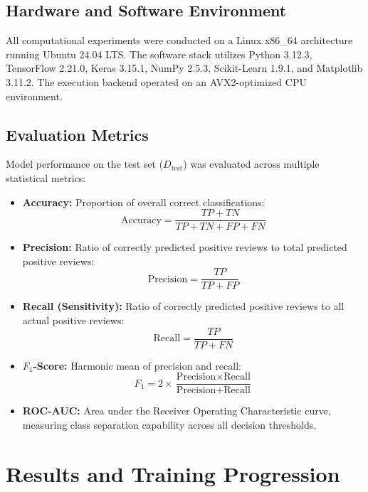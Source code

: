 \documentclass[11pt,a4paper]{article}
\begin{document}
\subsection{Hardware and Software Environment}
All computational experiments were conducted on a Linux x86\_64 architecture running Ubuntu 24.04 LTS. The software stack utilizes Python 3.12.3, TensorFlow 2.21.0, Keras 3.15.1, NumPy 2.5.3, Scikit-Learn 1.9.1, and Matplotlib 3.11.2. The execution backend operated on an AVX2-optimized CPU environment.

\subsection{Evaluation Metrics}
Model performance on the test set ($D_{\text{test}}$) was evaluated across multiple statistical metrics:
\begin{itemize}
    \item \textbf{Accuracy:} Proportion of overall correct classifications:
    \begin{equation}
    \text{Accuracy} = \frac{TP + TN}{TP + TN + FP + FN}
    \end{equation}
    \item \textbf{Precision:} Ratio of correctly predicted positive reviews to total predicted positive reviews:
    \begin{equation}
    \text{Precision} = \frac{TP}{TP + FP}
    \end{equation}
    \item \textbf{Recall (Sensitivity):} Ratio of correctly predicted positive reviews to all actual positive reviews:
    \begin{equation}
    \text{Recall} = \frac{TP}{TP + FN}
    \end{equation}
    \item \textbf{$F_1$-Score:} Harmonic mean of precision and recall:
    \begin{equation}
    F_1 = 2 \times \frac{\text{Precision} \times \text{Recall}}{\text{Precision} + \text{Recall}}
    \end{equation}
    \item \textbf{ROC-AUC:} Area under the Receiver Operating Characteristic curve, measuring class separation capability across all decision thresholds.
\end{itemize}

\section{Results and Training Progression}
\label{sec:results}
\end{document}

